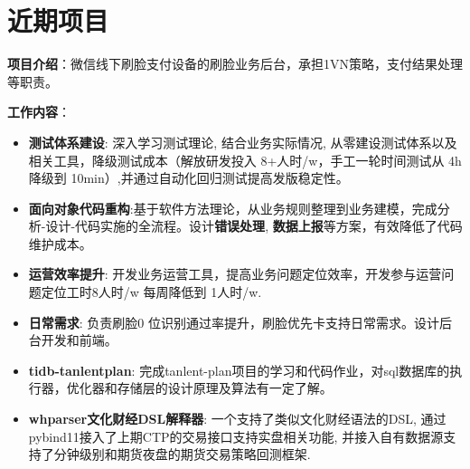 \documentclass{resume}
\begin{document}
\section{\faObjectGroup 近期项目}
\begin{onehalfspacing}
  \textbf{项目介绍}：\quad 微信线下刷脸支付设备的刷脸业务后台，承担1VN策略，支付结果处理等职责。  
 
 \textbf{工作内容}：\quad
 \begin{itemize}[parsep=0.5ex]
   \item \textbf{测试体系建设}: 深入学习测试理论, 结合业务实际情况, 从零建设测试体系以及相关工具，降级测试成本（解放研发投入 8+人时/w，手工一轮时间测试从 4h 降级到 10min）,并通过自动化回归测试提高发版稳定性。
   \item \textbf{面向对象代码重构}:基于软件方法理论，从业务规则整理到业务建模，完成分析-设计-代码实施的全流程。设计\textbf{错误处理}, \textbf{数据上报}等方案，有效降低了代码维护成本。
   \item \textbf{运营效率提升}: 开发业务运营工具，提高业务问题定位效率，开发参与运营问题定位工时8人时/w 每周降低到 1人时/w.
   \item \textbf{日常需求}: 负责刷脸0 位识别通过率提升，刷脸优先卡支持日常需求。设计后台开发和前端。
\end{itemize}

\end{onehalfspacing}

\begin{onehalfspacing}
\begin{itemize}[parsep=0.5ex]
    \item \textbf{tidb-tanlentplan}:  完成tanlent-plan项目的学习和代码作业，对sql数据库的执行器，优化器和存储层的设计原理及算法有一定了解。
    \item \textbf{whparser文化财经DSL解释器}: 一个支持了类似文化财经语法的DSL, 通过pybind11接入了上期CTP的交易接口支持实盘相关功能, 并接入自有数据源支持了分钟级别和期货夜盘的期货交易策略回测框架.
\end{itemize}


\end{onehalfspacing}
\end{document}
